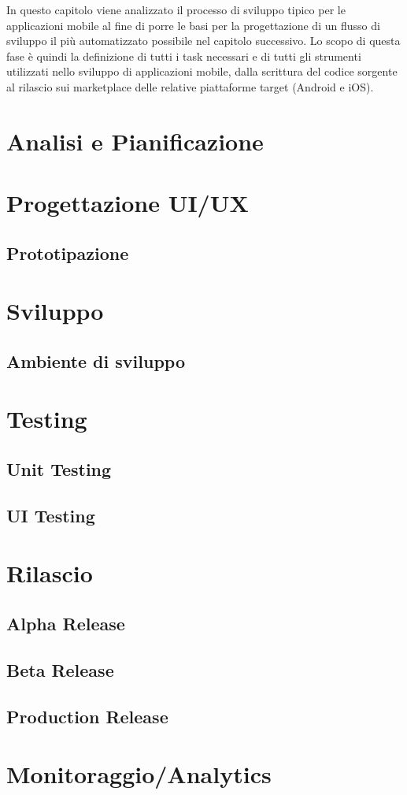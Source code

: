 
In questo capitolo viene analizzato il processo di sviluppo tipico per le applicazioni mobile al fine di porre le basi per la progettazione di un flusso di sviluppo il più automatizzato possibile nel capitolo successivo. Lo scopo di questa fase è quindi la definizione di tutti i task necessari e di tutti gli strumenti utilizzati nello sviluppo di applicazioni mobile, dalla scrittura del codice sorgente al rilascio sui marketplace delle relative piattaforme target (Android e iOS).
\section{Analisi e Pianificazione}
\section{Progettazione UI/UX}
\subsection{Prototipazione}
\section{Sviluppo}
\subsection{Ambiente di sviluppo}
\section{Testing}
\subsection{Unit Testing}
\subsection{UI Testing}
\section{Rilascio}
\subsection{Alpha Release}
\subsection{Beta Release}
\subsection{Production Release}

\section{Monitoraggio/Analytics}

